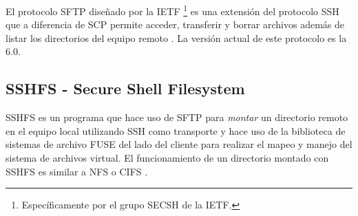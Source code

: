 El protocolo \textsc{SFTP} dise\~{n}ado por la \textsc{IETF} \footnote{Espec\'{i}ficamente por el grupo \textsc{SECSH} de la \textsc{IETF}.} es una extensi\'{o}n del protocolo \textsc{SSH} que a diferencia de \textsc{SCP} permite acceder, transferir y borrar archivos adem\'{a}s de listar los directorios del equipo remoto \cite{_chrooted_????}. La versi\'{o}n actual de este protocolo es la 6.0.

  \subsection {SSHFS - Secure Shell Filesystem}

\textsc{SSHFS} es un programa que hace uso de \textsc{SFTP} para \textit{montar} un directorio remoto en el equipo local utilizando \textsc{SSH} como transporte \cite{_sshfs_????} y hace uso de la biblioteca de sistemas de archivo \textsc{FUSE} \cite{_ssh_????} del lado del cliente para realizar el mapeo y manejo del sistema de archivos virtual. El funcionamiento de un directorio montado con \textsc{SSHFS} es similar a \textsc{NFS} o \textsc{CIFS} \cite{_sshfs:_????}.


